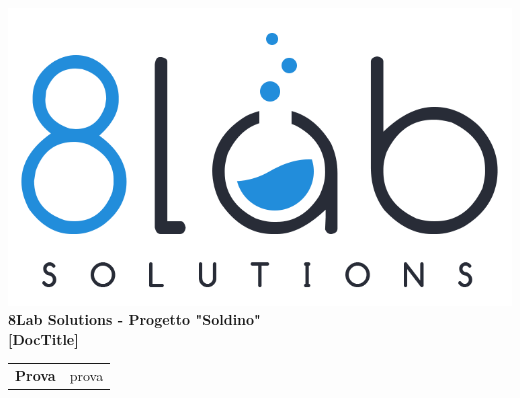 \thispagestyle{empty}
\begin{titlepage}
	\begin{center}
		\includegraphics[scale = 0.3]{images/logo8_crop.png}\\
		\large \textbf{8Lab Solutions - Progetto "Soldino"} \\
		\vfill
		\Huge \textbf{[DocTitle]}
		\vspace*{\fill}
        
        \vfill
        \large
        \begin{tabular}{r|l}
        	\textbf{Prova} & prova   \\     
        \end{tabular}
	\end{center}
\end{titlepage}